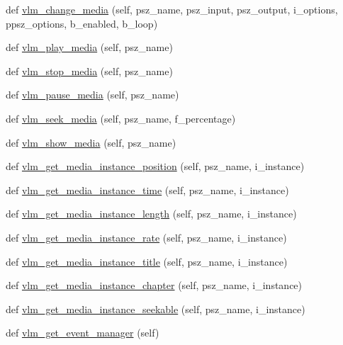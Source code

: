\begin{DoxyCompactItemize}
def \hyperlink{classvlc_1_1_instance_a58e7917b82e1cf76c6f2cd73cbcf7cfe}{vlm\+\_\+change\+\_\+media} (self, psz\+\_\+name, psz\+\_\+input, psz\+\_\+output, i\+\_\+options, ppsz\+\_\+options, b\+\_\+enabled, b\+\_\+loop)
\item 
def \hyperlink{classvlc_1_1_instance_a7d5047e2733ed1a7c7713bf9c097395d}{vlm\+\_\+play\+\_\+media} (self, psz\+\_\+name)
\item 
def \hyperlink{classvlc_1_1_instance_a0b4acb6d5c4bcc6b134887a58079427d}{vlm\+\_\+stop\+\_\+media} (self, psz\+\_\+name)
\item 
def \hyperlink{classvlc_1_1_instance_ae29c5cbd8b89178373fae922d03c85a5}{vlm\+\_\+pause\+\_\+media} (self, psz\+\_\+name)
\item 
def \hyperlink{classvlc_1_1_instance_a507fdd00d3a2be49e8336ea77a7fe315}{vlm\+\_\+seek\+\_\+media} (self, psz\+\_\+name, f\+\_\+percentage)
\item 
def \hyperlink{classvlc_1_1_instance_a49b576ac1b1d7db57ebaf616d02cc7dc}{vlm\+\_\+show\+\_\+media} (self, psz\+\_\+name)
\item 
def \hyperlink{classvlc_1_1_instance_aaeb05c756ee13453ef1ddb527c4a3971}{vlm\+\_\+get\+\_\+media\+\_\+instance\+\_\+position} (self, psz\+\_\+name, i\+\_\+instance)
\item 
def \hyperlink{classvlc_1_1_instance_ad91c405b7c321f63205ae6bd3d1a2591}{vlm\+\_\+get\+\_\+media\+\_\+instance\+\_\+time} (self, psz\+\_\+name, i\+\_\+instance)
\item 
def \hyperlink{classvlc_1_1_instance_afdfbfb3da424196fb3ada02d3af20c34}{vlm\+\_\+get\+\_\+media\+\_\+instance\+\_\+length} (self, psz\+\_\+name, i\+\_\+instance)
\item 
def \hyperlink{classvlc_1_1_instance_aa77010aa624034fe43391cb0604f7d08}{vlm\+\_\+get\+\_\+media\+\_\+instance\+\_\+rate} (self, psz\+\_\+name, i\+\_\+instance)
\item 
def \hyperlink{classvlc_1_1_instance_ada993533f9c1e0ac7b29e902ed26573a}{vlm\+\_\+get\+\_\+media\+\_\+instance\+\_\+title} (self, psz\+\_\+name, i\+\_\+instance)
\item 
def \hyperlink{classvlc_1_1_instance_ae060ff32b135cd2bf8990ad5fafc6143}{vlm\+\_\+get\+\_\+media\+\_\+instance\+\_\+chapter} (self, psz\+\_\+name, i\+\_\+instance)
\item 
def \hyperlink{classvlc_1_1_instance_a9163e1a129b34347564989ec3c860785}{vlm\+\_\+get\+\_\+media\+\_\+instance\+\_\+seekable} (self, psz\+\_\+name, i\+\_\+instance)
\item 
def \hyperlink{classvlc_1_1_instance_a1eb24fac1f012e58b9baf7dcb0676588}{vlm\+\_\+get\+\_\+event\+\_\+manager} (self)

\end{DoxyCompactItemize}
